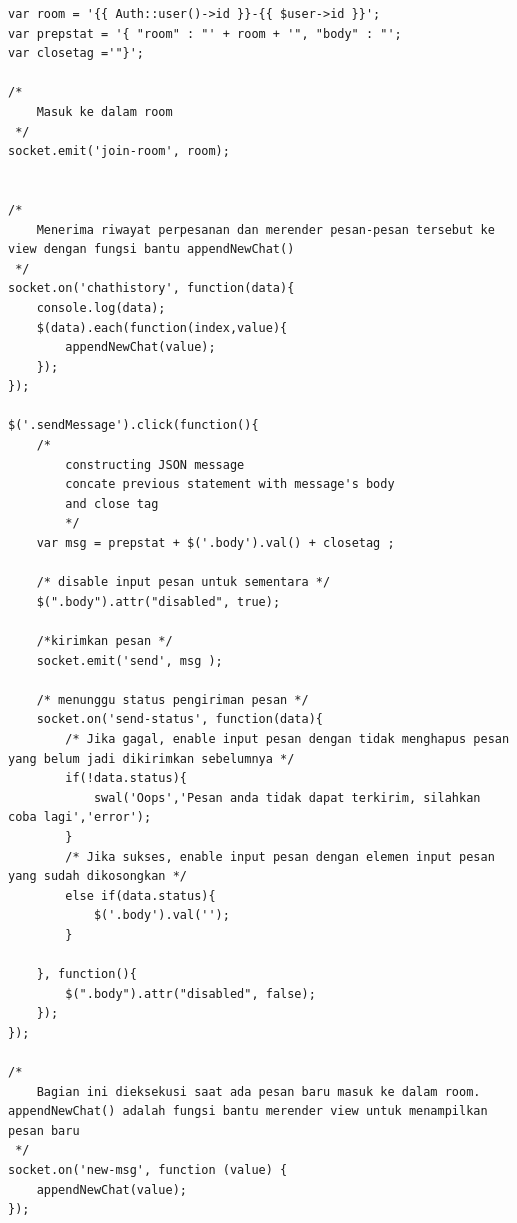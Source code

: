 \begin{lstlisting}[label=cdjq.04-04,style=htmlcssjs,caption=Kode Sumber Logika Pengiriman \& Penerimaan Pesan (menggunakan jQuery)]
var room = '{{ Auth::user()->id }}-{{ $user->id }}';
var prepstat = '{ "room" : "' + room + '", "body" : "';
var closetag ='"}';

/* 
	Masuk ke dalam room
 */
socket.emit('join-room', room);


/* 
	Menerima riwayat perpesanan dan merender pesan-pesan tersebut ke view dengan fungsi bantu appendNewChat()
 */
socket.on('chathistory', function(data){
    console.log(data);
    $(data).each(function(index,value){
        appendNewChat(value);
    });
});

$('.sendMessage').click(function(){
	/*	
		constructing JSON message 
		concate previous statement with message's body
		and close tag
		*/
    var msg = prepstat + $('.body').val() + closetag ;

    /* disable input pesan untuk sementara */
    $(".body").attr("disabled", true);

    /*kirimkan pesan */
    socket.emit('send', msg );

    /* menunggu status pengiriman pesan */
    socket.on('send-status', function(data){
    	/* Jika gagal, enable input pesan dengan tidak menghapus pesan yang belum jadi dikirimkan sebelumnya */
        if(!data.status){
            swal('Oops','Pesan anda tidak dapat terkirim, silahkan coba lagi','error');
        }
        /* Jika sukses, enable input pesan dengan elemen input pesan yang sudah dikosongkan */
        else if(data.status){
            $('.body').val('');
        }

    }, function(){
        $(".body").attr("disabled", false);
    });
});

/* 
	Bagian ini dieksekusi saat ada pesan baru masuk ke dalam room. appendNewChat() adalah fungsi bantu merender view untuk menampilkan pesan baru
 */
socket.on('new-msg', function (value) {
    appendNewChat(value);
});
\end{lstlisting}